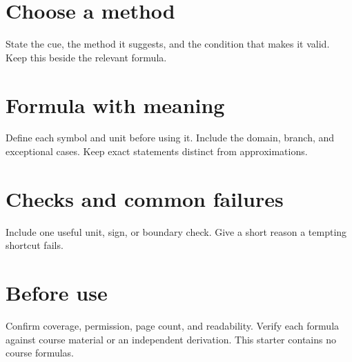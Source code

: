 \documentclass[11pt]{article}
\begin{document}
\section*{Choose a method}
State the cue, the method it suggests, and the condition that makes it valid. Keep this beside the relevant formula.
\section*{Formula with meaning}
Define each symbol and unit before using it. Include the domain, branch, and exceptional cases. Keep exact statements distinct from approximations.
\section*{Checks and common failures}
Include one useful unit, sign, or boundary check. Give a short reason a tempting shortcut fails.
\section*{Before use}
Confirm coverage, permission, page count, and readability. Verify each formula against course material or an independent derivation. This starter contains no course formulas.
\end{document}
